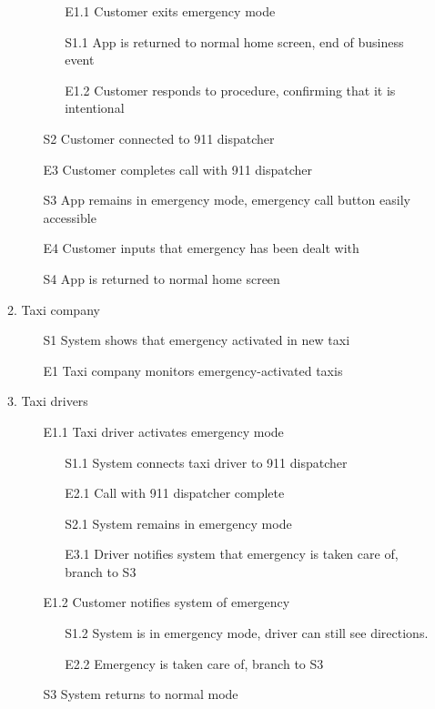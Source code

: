 \documentclass[]{article}
\begin{document}
\begin{enumerate}[{BE}1.]
\begin{enumerate}[{VP6}.1]
\begin{enumerate}
\begin{enumerate}
					\item[E1.1] Customer exits emergency mode
					\item[S1.1] App is returned to normal home screen, end of business event
					\item[E1.2] Customer responds to procedure, confirming that it is intentional
				\end{enumerate}
				\item[S2] Customer connected to 911 dispatcher
				\item[E3] Customer completes call with 911 dispatcher
				\item[S3] App remains in emergency mode, emergency call button easily accessible
				\item[E4] Customer inputs that emergency has been dealt with
				\item[S4] App is returned to normal home screen
			\end{enumerate}
		\item Taxi company
			\begin{enumerate}
				\item[S1] System shows that emergency activated in new taxi
				\item[E1] Taxi company monitors emergency-activated taxis
			\end{enumerate}
		\item Taxi drivers
			\begin{enumerate}
				\item[E1.1] Taxi driver activates emergency mode
				\begin{enumerate}
					\item[S1.1] System connects taxi driver to 911 dispatcher
					\item[E2.1] Call with 911 dispatcher complete
					\item[S2.1] System remains in emergency mode
					\item[E3.1] Driver notifies system that emergency is taken care of, branch to S3
				\end{enumerate}
				\item[E1.2] Customer notifies system of emergency
				\begin{enumerate}
					\item[S1.2] System is in emergency mode, driver can still see directions.
					\item[E2.2] Emergency is taken care of, branch to S3
				\end{enumerate}
				\item[S3] System returns to normal mode

\end{enumerate}
\end{enumerate}
\end{enumerate}
\end{document}

